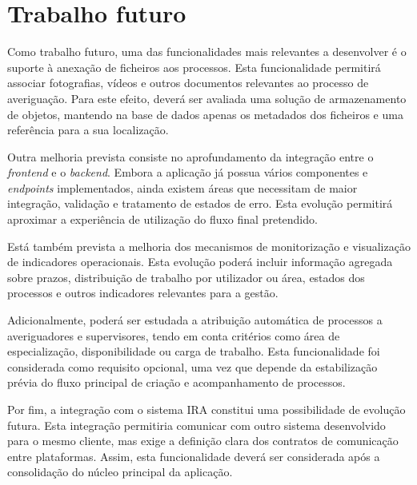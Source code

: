 \section{Trabalho futuro} \label{sec:trabalho-futuro}

Como trabalho futuro, uma das funcionalidades mais relevantes a desenvolver \'{e} o suporte \`{a} anexa\c{c}\~{a}o de ficheiros aos processos. Esta funcionalidade permitir\'{a} associar fotografias, v\'{i}deos e outros documentos relevantes ao processo de averigua\c{c}\~{a}o. Para este efeito, dever\'{a} ser avaliada uma solu\c{c}\~{a}o de armazenamento de objetos, mantendo na base de dados apenas os metadados dos ficheiros e uma refer\^{e}ncia para a sua localiza\c{c}\~{a}o.

Outra melhoria prevista consiste no aprofundamento da integra\c{c}\~{a}o entre o \textit{frontend} e o \textit{backend}. Embora a aplica\c{c}\~{a}o j\'{a} possua v\'{a}rios componentes e \textit{endpoints} implementados, ainda existem \'{a}reas que necessitam de maior integra\c{c}\~{a}o, valida\c{c}\~{a}o e tratamento de estados de erro. Esta evolu\c{c}\~{a}o permitir\'{a} aproximar a experi\^{e}ncia de utiliza\c{c}\~{a}o do fluxo final pretendido.

Est\'{a} tamb\'{e}m prevista a melhoria dos mecanismos de monitoriza\c{c}\~{a}o e visualiza\c{c}\~{a}o de indicadores operacionais. Esta evolu\c{c}\~{a}o poder\'{a} incluir informa\c{c}\~{a}o agregada sobre prazos, distribui\c{c}\~{a}o de trabalho por utilizador ou \'{a}rea, estados dos processos e outros indicadores relevantes para a gest\~{a}o.

Adicionalmente, poder\'{a} ser estudada a atribui\c{c}\~{a}o autom\'{a}tica de processos a averiguadores e supervisores, tendo em conta crit\'{e}rios como \'{a}rea de especializa\c{c}\~{a}o, disponibilidade ou carga de trabalho. Esta funcionalidade foi considerada como requisito opcional, uma vez que depende da estabiliza\c{c}\~{a}o pr\'{e}via do fluxo principal de cria\c{c}\~{a}o e acompanhamento de processos.

Por fim, a integra\c{c}\~{a}o com o sistema IRA constitui uma possibilidade de evolu\c{c}\~{a}o futura. Esta integra\c{c}\~{a}o permitiria comunicar com outro sistema desenvolvido para o mesmo cliente, mas exige a defini\c{c}\~{a}o clara dos contratos de comunica\c{c}\~{a}o entre plataformas. Assim, esta funcionalidade dever\'{a} ser considerada ap\'{o}s a consolida\c{c}\~{a}o do n\'{u}cleo principal da aplica\c{c}\~{a}o.
